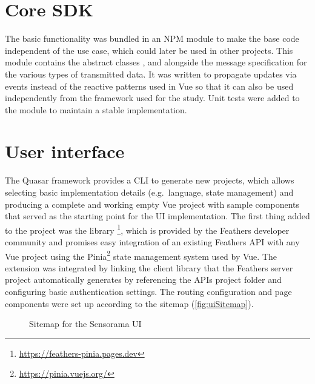 \section{Core SDK}
\label{sec:core-sdk}

The basic functionality was bundled in an \ac{NPM} module to make the base code independent of the use case, which could later be used in other projects.
This module contains the abstract classes ,  and  alongside the message specification for the various types of transmitted data.
It was written to propagate updates via events instead of the reactive patterns used in Vue so that it can also be used independently from the framework used for the study.
Unit tests were added to the module to maintain a stable implementation.

\section{User interface}
\label{sec:user-interface}

The Quasar framework provides a \ac{CLI} to generate new projects, which allows selecting basic implementation details (e.g.\ language, state management) and producing a complete and working empty Vue project with sample components that served as the starting point for the \ac{UI} implementation.
The first thing added to the project was the library \footnote{\url{https://feathers-pinia.pages.dev}}, which is provided by the Feathers developer community and promises easy integration of an existing Feathers \ac{API} with any Vue project using the Pinia\footnote{\url{https://pinia.vuejs.org/}} state management system used by Vue.
The extension was integrated by linking the client library that the Feathers server project automatically generates by referencing the \ac{API}\textquotesingle s project folder and configuring basic authentication settings.
The routing configuration and page components were set up according to the sitemap (\autoref{fig:uiSitemap}).

\begin{figure}[!ht]

\caption[Sensorama UI sitemap]{Sitemap for the Sensorama UI\protect}
\label{fig:uiSitemap}
\end{figure}


